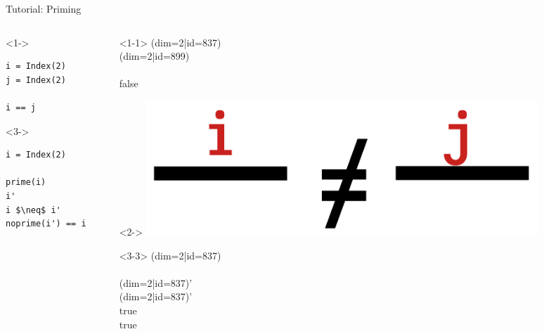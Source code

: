 \begin{frame}[fragile]{Tutorial: Priming}

\begin{columns}

\begin{column}{4.5cm}

\begin{onlyenv}<1->
\begin{lstlisting}[language=JuliaLocal, style=julia, basicstyle=\small]
i = Index(2)
j = Index(2)

i == j
\end{lstlisting}
\end{onlyenv}

\begin{onlyenv}<3->
\begin{lstlisting}[language=JuliaLocal, style=julia, mathescape, basicstyle=\small]
i = Index(2)

prime(i)
i'
i $\neq$ i'
noprime(i') == i
\end{lstlisting}
\end{onlyenv}

\end{column}

\begin{column}{4.5cm}

\begin{onlyenv}<1-1>
(dim=2|id=837) \\
(dim=2|id=899) \\
~\\
false \\
\end{onlyenv}

\begin{onlyenv}<2->
\includegraphics[width=0.8\textwidth]{
  slides/assets/i_neq_j.png
}
\vspace*{1.0cm}
\end{onlyenv}

\begin{onlyenv}<3-3>
(dim=2|id=837) \\
~\\
(dim=2|id=837)' \\
(dim=2|id=837)' \\
true \\
true
\end{onlyenv}


\end{column}
\end{columns}
\end{frame}
